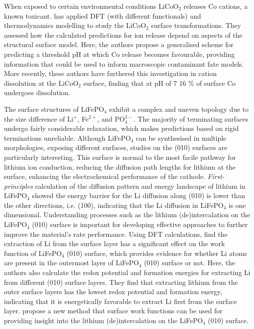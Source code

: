 \documentclass[../main.tex]{subfiles}
\begin{document}
When exposed to certain environmental conditions LiCoO$_2$ releases Co cations, a known toxicant. \citeauthor{abbaspou2019} has applied DFT (with different functionals) and thermodynamics modelling to study the LiCoO$_2$ surface transformations. \cite{abbaspou2019} They assessed how the calculated predictions for ion release depend on aspects of the structural surface model. Here, the authors propose a generalised scheme for predicting a threshold pH at which Co release becomes favourable, providing information that could be used to inform macroscopic contaminant fate models. More recently, these authors have furthered this investigation in cation dissolution at the LiCoO$_2$ surface, finding that at pH of 7 16 \% of surface Co undergoes dissolution. \cite{abbaspour2020dft}

The surface structures of LiFePO$_4$ exhibit a complex and uneven topology due to the size difference of Li$^+$, Fe$^{2+}$, and PO$_{4}^{3-}$. The majority of terminating surfaces undergo fairly considerable relaxation, which makes predictions based on rigid terminations unreliable. Although LiFePO$_4$ can be synthesised in multiple morphologies, \cite{chen2006electron,ellis2007synthesis} exposing different surfaces, studies on the (010) surfaces are particularly interesting. This surface is normal to the most facile pathway for lithium ion conduction, \cite{islam2010recent} reducing the diffusion path lengths for lithium at the surface, enhancing the electrochemical performance of the cathode. \textit{First-principles} calculation of the diffusion pattern and energy landscape of lithium in LiFePO$_4$ showed the energy barrier for the Li diffusion along (010) is lower than the other directions, i.e. (100), indicating that the Li diffusion in LiFePO$_4$ is one dimensional. \cite{tankhilsaikhan2019density} Understanding processes such as the lithium (de)intercalation on the LiFePO$_4$ (010) surface is important for developing effective approaches to further improve the material's rate performance. Using DFT calculations, \citeauthor{xu2019insight} find the extraction of Li from the surface layer has a significant effect on the work function of LiFePO$_4$ (010) surface, which provides evidence for whether Li atoms are present in the outermost layer of LiFePO$_4$ (010) surface or not. \cite{xu2019insight} Here, the authors also calculate the redox potential and formation energies for extracting Li from different (010) surface layers. They find that extracting lithium from the outer surface layers has the lowest redox potential and formation energy, indicating that it is energetically favorable to extract Li first from the surface layer. \citeauthor{xu2019insight} propose a new method that surface work functions can be used for providing insight into the lithium (de)intercalation on the LiFePO$_4$ (010) surface. \cite{xu2019insight}
\end{document}
